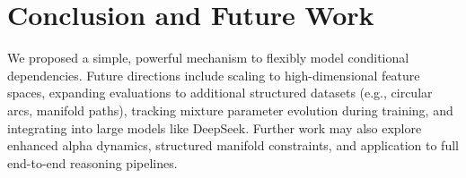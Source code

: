 \documentclass[11pt]{article}
\begin{document}
\section{Conclusion and Future Work}
We proposed a simple, powerful mechanism to flexibly model conditional dependencies. Future directions include scaling to high-dimensional feature spaces, expanding evaluations to additional structured datasets (e.g., circular arcs, manifold paths), tracking mixture parameter evolution during training, and integrating into large models like DeepSeek. Further work may also explore enhanced alpha dynamics, structured manifold constraints, and application to full end-to-end reasoning pipelines.


\end{document}
